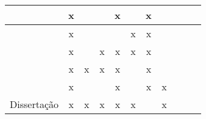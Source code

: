 \begin{table}[]
\begin{tabular}{|c|c|c|c|c|c|c|c|c|c|c|}
    \cite{32.95}          & x         &  ~            & ~     & x     & ~             & x         & ~              \\ \hline
    \cite{12}             & x         &  ~            & ~     & ~     & x             & x         & ~              \\ \hline
    \cite{21}             & x         &  ~            & x     & x     & x             & x         & ~              \\ \hline
    \cite{pca6}           & x         & x             & x     & x     & ~             & x         & ~              \\ \hline
    \cite{odyssey2024}    & x         & ~             & ~     & x     & ~             & x         & x              \\ \hline
    Dissertação           & x         & x             & x     & x     & x             & ~         & x              \\ \hline
    \end{tabular}\label{table:discussao}
\end{table}

